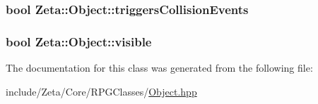 \hypertarget{classZeta_1_1Object_a3934d0e7fed3786937394643d2adc24c}{
\subsubsection[{triggers\+Collision\+Events}]{\setlength{\rightskip}{0pt plus 5cm}bool Zeta\+::\+Object\+::triggers\+Collision\+Events\hspace{0.3cm}{\ttfamily [protected]}}}\label{classZeta_1_1Object_a3934d0e7fed3786937394643d2adc24c}
\hypertarget{classZeta_1_1Object_ade6a7a114b24232510cb6a23a2547f4d}{
\subsubsection[{visible}]{\setlength{\rightskip}{0pt plus 5cm}bool Zeta\+::\+Object\+::visible\hspace{0.3cm}{\ttfamily [protected]}}}\label{classZeta_1_1Object_ade6a7a114b24232510cb6a23a2547f4d}


The documentation for this class was generated from the following file\+:\begin{DoxyCompactItemize}
\item 
include/\+Zeta/\+Core/\+R\+P\+G\+Classes/\hyperlink{Object_8hpp}{Object.\+hpp}\end{DoxyCompactItemize}
